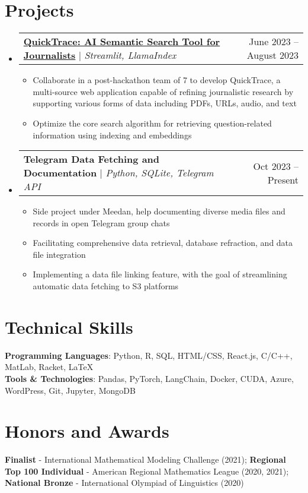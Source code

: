 \documentclass[letterpaper,11pt]{article}
\makeatletter
\newcommand{\resumeItem}[1]{
  \item\small{
    {#1 \vspace{-2pt}}
  }
}
\newcommand{\resumeProjectHeading}[2]{
    \item
    \begin{tabular*}{0.97\textwidth}{l@{\extracolsep{\fill}}r}
      \small#1 & #2 \\
    \end{tabular*}\vspace{-7pt}
}
\newcommand{\resumeSubHeadingListStart}{\begin{itemize}[leftmargin=0.15in, label={}]}
\newcommand{\resumeSubHeadingListEnd}{\end{itemize}}
\newcommand{\resumeItemListStart}{\begin{itemize}}
\newcommand{\resumeItemListEnd}{\end{itemize}\vspace{-5pt}}
\makeatother
\begin{document}
\section{Projects}
    \resumeSubHeadingListStart
    \resumeProjectHeading
       {\href{https://github.com/QuickTrace/quicktrace}{\textbf{QuickTrace: AI Semantic Search Tool for Journalists}} $|$ \emph{Streamlit, LlamaIndex}}{June 2023 -- August 2023}
          \resumeItemListStart
            \resumeItem{Collaborate in a post-hackathon team of 7 to develop QuickTrace, a multi-source web application capable of refining journalistic research by supporting various forms of data including PDFs, URLs, audio, and text}
            \resumeItem{Optimize the core search algorithm for retrieving question-related information using indexing and embeddings}
          \resumeItemListEnd
     \resumeProjectHeading
        {\textbf{Telegram Data Fetching and Documentation} $|$ \emph{Python, SQLite, Telegram API}}{Oct 2023 -- Present}
        \resumeItemListStart
            \resumeItem{Side project under Meedan, help documenting diverse media files and records in open Telegram group chats}
            \resumeItem{Facilitating comprehensive data retrieval, database refraction, and data file integration}
            \resumeItem{Implementing a data file linking feature, with the goal of streamlining automatic data fetching to S3 platforms}
        \resumeItemListEnd
    \resumeSubHeadingListEnd

\section{Technical Skills}
 \begin{itemize}[leftmargin=0.15in, label={}]
    \small{\item{
     \textbf{Programming Languages}{: Python, R, SQL, HTML/CSS, React.js, C/C++,  MatLab, Racket, \LaTeX} \\
     \textbf{Tools \& Technologies}{: Pandas, PyTorch, LangChain, Docker, CUDA, Azure, WordPress, Git, Jupyter, MongoDB} \\
    }}
 \end{itemize}

\section{Honors and Awards}
 \begin{itemize}[leftmargin=0.15in, label={}]
    \small{\item{
     \textbf{Finalist} - International Mathematical Modeling Challenge (2021);  
     \textbf{Regional Top 100 Individual} - American Regional Mathematics League (2020, 2021); \textbf{National Bronze} - International Olympiad of Linguistics (2020)} \\
    }
 \end{itemize}



\end{document}
